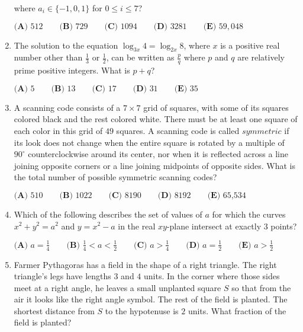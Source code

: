 \documentclass{article}
\begin{document}
\begin{enumerate}[label=\arabic*., itemsep=0.5em]
where $a_i\in \{-1,0,1\}$ for $0\le i \le 7$?

$\textbf{(A) } 512 \qquad 
\textbf{(B) } 729 \qquad 
\textbf{(C) } 1094 \qquad 
\textbf{(D) } 3281 \qquad 
\textbf{(E) } 59,048 $\par \vspace{0.5em}\item The solution to the equation $\log_{3x} 4 = \log_{2x} 8$, where $x$ is a positive real number other than $\frac{1}{3}$ or $\frac{1}{2}$, can be written as $\frac {p}{q}$ where $p$ and $q$ are relatively prime positive integers. What is $p + q$?

$\textbf{(A) } 5   \qquad    
\textbf{(B) } 13   \qquad    
\textbf{(C) } 17   \qquad   
\textbf{(D) } 31 \qquad  
\textbf{(E) } 35 $\par \vspace{0.5em}\item A scanning code consists of a $7 \times 7$ grid of squares, with some of its squares colored black and the rest colored white. There must be at least one square of each color in this grid of $49$ squares. A scanning code is called $\textit{symmetric}$ if its look does not change when the entire square is rotated by a multiple of $90 ^{\circ}$ counterclockwise around its center, nor when it is reflected across a line joining opposite corners or a line joining midpoints of opposite sides. What is the total number of possible symmetric scanning codes?

$\textbf{(A)} \text{ 510} \qquad \textbf{(B)} \text{ 1022} \qquad \textbf{(C)} \text{ 8190} \qquad \textbf{(D)} \text{ 8192} \qquad \textbf{(E)} \text{ 65,534}$\par \vspace{0.5em}\item Which of the following describes the set of values of $a$ for which the curves $x^2+y^2=a^2$ and $y=x^2-a$ in the real $xy$-plane intersect at exactly $3$ points?

$
\textbf{(A) }a=\frac14 \qquad
\textbf{(B) }\frac14 < a < \frac12 \qquad
\textbf{(C) }a>\frac14 \qquad
\textbf{(D) }a=\frac12 \qquad
\textbf{(E) }a>\frac12 \qquad
$\par \vspace{0.5em}\item Farmer Pythagoras has a field in the shape of a right triangle. The right triangle's legs have lengths $3$ and $4$ units. In the corner where those sides meet at a right angle, he leaves a small unplanted square $S$ so that from the air it looks like the right angle symbol. The rest of the field is planted. The shortest distance from $S$ to the hypotenuse is $2$ units. What fraction of the field is planted?



\end{enumerate}
\end{document}
